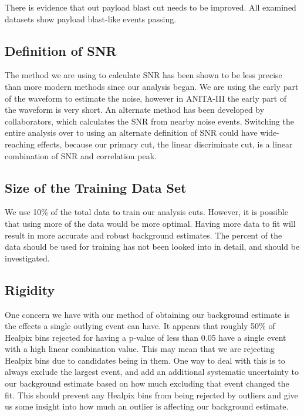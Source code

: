 There is evidence that out payload blast cut needs to be improved.  All examined datasets show payload blast-like events passing.  

\subsection{Definition of SNR}

The method we are using to calculate SNR has been shown to be less precise than more modern methods since our analysis began. We are using the early part of the waveform to estimate the noise, however in ANITA-III the early part of the waveform is very short. An alternate method has been developed by collaborators, which calculates the SNR from nearby noise events. Switching the entire analysis over to using an alternate definition of SNR could have wide-reaching effects, because our primary cut, the linear discriminate cut, is a linear combination of SNR and correlation peak.

\subsection{Size of the Training Data Set}

We use 10\% of the total data to train our analysis cuts. However, it is possible that using more of the data would be more optimal. Having more data to fit will result in more accurate and robust background estimates. The percent of the data should be used for training has not been looked into in detail, and should be investigated.

\subsection{Rigidity}

One concern we have with our method of obtaining our background estimate is the effects a single outlying event can have. It appears that roughly 50\% of Healpix bins rejected for having a p-value of less than 0.05 have a single event with a high linear combination value. This may mean that we are rejecting Healpix bins due to candidates being in them. One way to deal with this is to always exclude the largest event, and add an additional systematic uncertainty to our background estimate based on how much excluding that event changed the fit. This should prevent any Healpix bins from being rejected by outliers and give us some insight into how much an outlier is affecting our background estimate.

